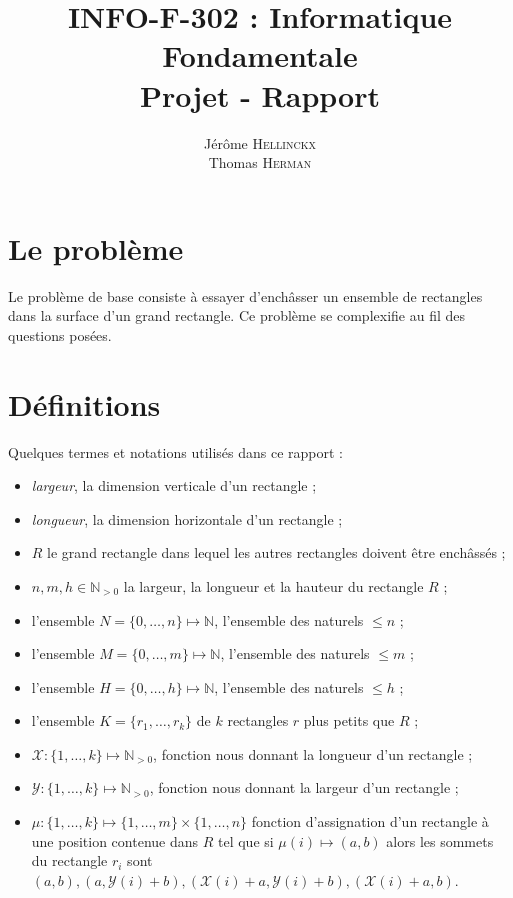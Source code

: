 \documentclass[a4paper]{article}
\title{{\textsc{INFO-F-302} : Informatique Fondamentale} \\ Projet - Rapport}
\author{Jérôme \textsc{Hellinckx} \\ Thomas \textsc{Herman}}
\begin{document}
\renewcommand{\labelitemi}{$\bullet$}

\maketitle

\section{Le problème}
Le problème de base consiste à essayer d'enchâsser un ensemble de rectangles dans la surface d'un grand rectangle. Ce problème se complexifie au fil des questions posées. 

\section{Définitions}
Quelques termes et notations utilisés dans ce rapport : 
\begin{itemize}
	\item \textit{largeur}, la dimension verticale d'un rectangle ;
	\item \textit{longueur}, la dimension horizontale d'un rectangle ;
	\item $R$ le grand rectangle dans lequel les autres rectangles doivent être enchâssés ;
	\item $ n,m, h \in \mathbb{N}_{>0} $ la largeur, la longueur et la hauteur du rectangle $R$ ;
	\item l'ensemble $N = \{0,\dots,n\} \mapsto \mathbb{N}$, l'ensemble des naturels $\leq n$ ;
   	\item l'ensemble $M = \{0,\dots,m\} \mapsto \mathbb{N}$, l'ensemble des naturels $\leq m$ ;
        \item l'ensemble $H = \{0,\dots,h\} \mapsto \mathbb{N}$, l'ensemble des naturels $\leq h$ ;
	\item l'ensemble $K = \{r_1,\dots ,r_k\}$ de $k$ rectangles $r$ plus petits que $R$ ;
	\item $\mathcal{X}:\{1,\dots,k\} \mapsto \mathbb{N}_{>0} $, fonction nous donnant la longueur d'un rectangle ;
	\item $\mathcal{Y}:\{1,\dots,k\} \mapsto \mathbb{N}_{>0} $, fonction nous donnant la largeur d'un rectangle ;
	\item $\mu :\{1,\dots,k\} \mapsto \{1,\dots,m\}\times\{1,\dots,n\}$ fonction d'assignation d'un rectangle à une position contenue dans $R$ tel que si $\mu(i) \mapsto (a,b)$ alors les sommets du rectangle $r_i$ sont $(a,b), (a,\mathcal{Y}(i)+b), (\mathcal{X}(i)+a,\mathcal{Y}(i)+b), (\mathcal{X}(i)+a,b)$.\\
	
	
\end{itemize}
\end{document}
